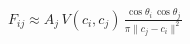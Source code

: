 \documentclass[border=6pt]{standalone}
\begin{document}
\color{white}
\(\displaystyle
F_{ij}
\approx
A_j\,
V(c_i,c_j)\,
\frac{\cos\theta_i\,\cos\theta_j}{\pi \lVert c_j-c_i\rVert^2}
\)
\end{document}
